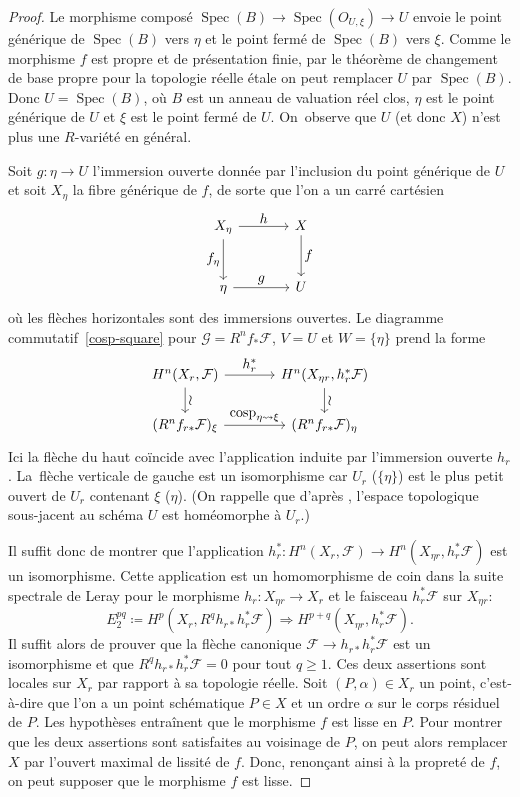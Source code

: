 \documentclass[JEP,XML,SOM,Unicode,francais,published]{cedram}
\let\ts\textstyle
\theoremstyle{definition}
\newcommand{\Spec}{\operatorname{Spec}}
\newcommand{\mc}[1]{\mathcal{#1}}
\newcommand{\on}[1]{\operatorname{#1}}
\begin{document}
\begin{proof}
Le morphisme composé $\Spec(B) \to \on{Spec}(O_{U,\xi})\to U$ envoie le point générique de $\on{Spec}(B)$ vers $\eta$ et le point fermé de $\on{Spec}(B)$ vers $\xi$. Comme le morphisme $f$ est propre et de présentation finie, par le théorème de changement de base propre pour la topologie réelle étale \cite[Th.\,16.2(a), $t=ret$]{scheiderer1994real} on peut remplacer $U$ par $\Spec(B)$. Donc $U = \Spec(B)$, où $B$ est un anneau de valuation réel clos, $\eta$ est le point générique de $U$ et $\xi$ est le point fermé de $U$. On~observe que $U$ (et donc $X$) n'est plus une $R$\nobreakdash-variété en général.

Soit $g\colon \eta \to U$ l'immersion ouverte donnée par l'inclusion du point générique de $U$ et soit $X_\eta$ la fibre générique de $f$, de sorte que l'on a un carré cartésien
\[
\begin{tikzcd}[column sep = large,row sep = large]
X_\eta \arrow[r,"\ts h"] \arrow[d,swap,"\ts f_\eta"] & X \arrow[d,"\ts f"] \\
\eta \arrow[r,"\ts g"] & U
\end{tikzcd}
\]
où les flèches horizontales sont des immersions ouvertes. Le diagramme commutatif~\eqref{cosp-square} pour $\mc{G}=R^nf_*\mc{F}$, $V=U$ et $W=\{\eta\}$ prend la forme\vspace*{-5pt}
\[
\begin{tikzcd}[column sep = large]
H^n(X_r, \mc{F}) \arrow[r,"\ts h_r^*"] \arrow[d,"\ts \wr"] & H^n(X_{\eta r}, h_r^* \mc{F}) \arrow[d,"\ts \wr"] \\
(R^n f_{r*} \mc{F})_{\xi} \arrow[r,"\ts \on{cosp}_{\eta\leadsto\xi}"] & (R^n f_{r*} \mc{F})_{\eta}
\end{tikzcd}
\]
Ici la flèche du haut coïncide avec l'application induite par l'immersion ouverte $h_r$. La~flèche verticale de gauche est un isomorphisme car $U_r$ (\resp $\{\eta\}$) est le plus petit ouvert de $U_r$ contenant $\xi$ (\resp $\eta$). (On rappelle que d'après \cite[(1.5)]{scheiderer1994real}, l'espace topologique sous-jacent au schéma $U$ est homéomorphe à $U_r$.)

Il suffit donc de montrer que l'application $h_r^*\colon H^n(X_r, \mc{F})\to H^n(X_{\eta r}, h_r^* \mc{F})$ est un isomorphisme. Cette application est un homomorphisme de coin dans la suite spectrale de Leray pour le morphisme $h_r\colon X_{\eta r}\to X_r$ et le faisceau $h_r^*\mc{F}$ sur $X_{\eta r}$:\vspace*{-3pt}
\[E_2^{pq}\coloneqq H^p(X_r,R^qh_{r*}h_r^{*}\mc{F})\Longrightarrow H^{p+q}(X_{\eta r},h_r^*\mc{F}).\]
Il suffit alors de prouver que la flèche canonique
$\mc{F} \to h_{r*}h_r^* \mc{F}$ est un isomorphisme et que $R^q h_{r*} h_r^* \mc{F} = 0$ pour tout $q\geq 1$.
Ces deux assertions sont locales sur $X_r$ par rapport à sa topologie réelle.
Soit $(P,\alpha)\in X_r$ un point, c'est-à-dire que l'on a un point schématique $P\in X$ et un ordre $\alpha$ sur le corps résiduel de $P$. Les hypothèses entraînent que le morphisme $f$ est lisse en $P$. Pour montrer que les deux assertions sont satisfaites au voisinage de $P$, on peut alors remplacer $X$ par l'ouvert maximal de lissité de $f$. Donc, renonçant ainsi à la propreté de $f$, on peut supposer que le morphisme $f$ est lisse.


\end{proof}
\end{document}
